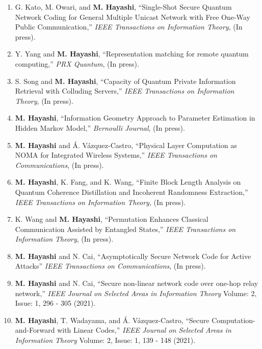 \documentclass[a4paper,12pt,oneside]{article}
\begin{document}
\begin{enumerate}
\item
G. Kato, M. Owari, and \textbf{M. Hayashi},
``Single-Shot Secure Quantum Network Coding for General Multiple Unicast Network with Free One-Way Public Communication,''
{\em IEEE Transactions on Information Theory}, 
(In press).

\item
Y. Yang and \textbf{M. Hayashi},
``Representation matching for remote quantum computing,''
{\em PRX Quantum},
(In press).

\item
S. Song and \textbf{M. Hayashi},
``Capacity of Quantum Private Information Retrieval with Colluding Servers,''
{\em IEEE Transactions on Information Theory}, 
(In press).

\item
\textbf{M. Hayashi},
``Information Geometry Approach to Parameter Estimation in Hidden Markov Model,''
{\em Bernoulli Journal},
(In press).

\item
\textbf{M. Hayashi} and \'{A}. V\'{a}zquez-Castro,
``Physical Layer Computation as NOMA for Integrated Wireless Systems,''
{\em IEEE Transactions on Communications},
(In press).

\item
\textbf{M. Hayashi}, K. Fang, and K. Wang,
``Finite Block Length Analysis on Quantum Coherence Distillation and Incoherent Randomness Extraction,''
{\em IEEE Transactions on Information Theory},
(In press).

\item
K. Wang and \textbf{M. Hayashi},
``Permutation Enhances Classical Communication Assisted by Entangled States,''
{\em IEEE Transactions on Information Theory},
(In press).

\item
\textbf{M. Hayashi} and N. Cai,
``Asymptotically Secure Network Code for Active Attacks''
{\em IEEE Transactions on Communications},
(In press).

\item
\textbf{M. Hayashi} and N. Cai,
``Secure non-linear network code over one-hop relay network,''
{\em IEEE Journal on Selected Areas in Information Theory}
Volume: 2, Issue: 1, 296 - 305 (2021).

\item
\textbf{M. Hayashi}, T. Wadayama, and \'{A}. V\'{a}zquez-Castro,
``Secure Computation-and-Forward with Linear Codes,''
{\em IEEE Journal on Selected Areas in Information Theory}
Volume: 2, Issue: 1, 139 - 148 (2021).


\end{enumerate}
\end{document}
